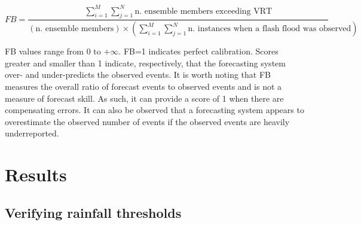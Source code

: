 \documentclass[techmemo]{ecmwfrep}%
\begin{document}
\begin{equation}
FB = \frac{\sum_{i=1}^{M} \sum_{j=1}^{N} \text{n. ensemble members exceeding VRT}}{\left(\text{n. ensemble members}\right) \times \left(\sum_{i=1}^{M} \sum_{j=1}^{N} \text{n. instances when a flash flood was observed}\right)} 
\label{eq:FB}
\end{equation}

FB values range from 0 to $+\infty$. FB=1 indicates perfect calibration. Scores greater and smaller than 1 indicate, respectively, that the forecasting system over- and under-predicts the observed events. It is worth noting that FB measures the overall ratio of forecast events to observed events and is not a measure of forecast skill. As such, it can provide a score of 1 when there are compensating errors. It can also be observed that a forecasting system appears to overestimate the observed number of events if the observed events are heavily underreported.


\section{Results}
\label{sec:Results}

\subsection{Verifying rainfall thresholds}
\end{document}
